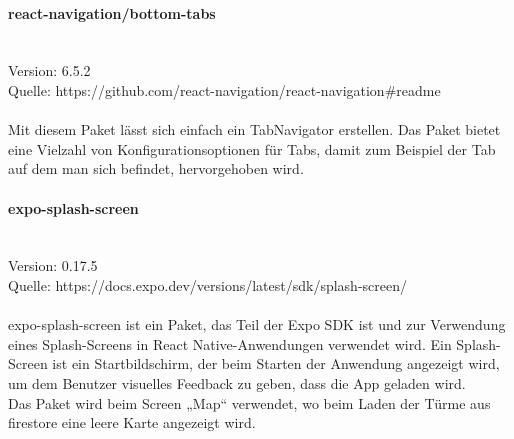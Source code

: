 \paragraph{react-navigation/bottom-tabs}\mbox{}\\
Version: 6.5.2\\
Quelle: https://github.com/react-navigation/react-navigation\#readme\\ \\
Mit diesem Paket lässt sich einfach ein TabNavigator erstellen. Das Paket bietet eine Vielzahl von Konfigurationsoptionen für Tabs, damit zum Beispiel der Tab auf dem man sich befindet, hervorgehoben wird.\\

\paragraph{expo-splash-screen}\mbox{}\\
Version: 0.17.5\\
Quelle: https://docs.expo.dev/versions/latest/sdk/splash-screen/\\ \\
expo-splash-screen ist ein Paket, das Teil der Expo SDK ist und zur Verwendung eines Splash-Screens in React Native-Anwendungen verwendet wird. Ein Splash-Screen ist ein Startbildschirm, der beim Starten der Anwendung angezeigt wird, um dem Benutzer visuelles Feedback zu geben, dass die App geladen wird.\\
Das Paket wird beim Screen „Map“ verwendet, wo beim Laden der Türme aus firestore eine leere Karte angezeigt wird.\\


